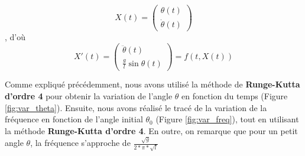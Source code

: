 \begin{equation}
    X(t) = \begin{pmatrix} \theta(t) \\ \dot{\theta}(t) \end{pmatrix}
\end{equation}
, d'où 
\begin{equation}
    X'(t) = \begin{pmatrix} \ddot{\theta}(t) \\ \frac{g}{l}\sin{\theta(t)} \end{pmatrix} = f(t, X(t))
    \label{eq:dif_simple_pendulum}
\end{equation}


Comme expliqué précédemment, nous avons utilisé la méthode de \textbf{Runge-Kutta d'ordre 4} pour obtenir la variation de l'angle $\theta$ en fonction du temps (Figure \ref{fig:var_theta}). Ensuite, nous avons réalisé le tracé de la variation de la fréquence en fonction de l'angle initial $\theta_0$ (Figure \ref{fig:var_freq}), tout en utilisant la méthode \textbf{Runge-Kutta d'ordre 4}. En outre, on remarque que pour un petit angle $\theta$, la fréquence s'approche de $\frac{\sqrt{g}}{2*\pi*\sqrt{l}}$

